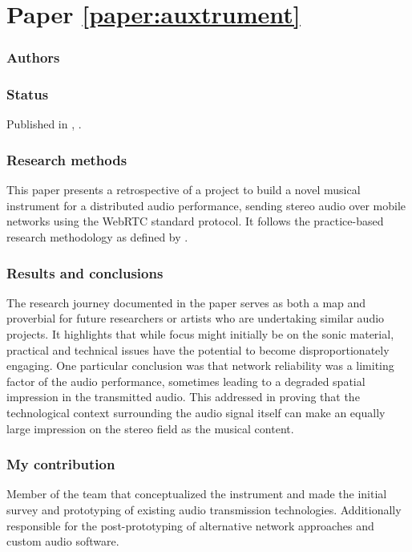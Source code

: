 \section*{Paper \ref{paper:auxtrument}}

\textbf{}

\subsubsection*{Authors}

\subsubsection*{Status}
Published in ,  \cite{franklinDevelopmentWebBasedRealTime2025}.

\subsubsection*{Research methods}
This paper presents a retrospective of a project to build a novel musical instrument for a  distributed audio performance, sending stereo audio over mobile networks using the WebRTC standard protocol. It follows the practice-based research methodology as defined by .

\subsubsection*{Results and conclusions}
The research journey documented in the paper serves as both a map and proverbial  for future researchers or artists who are undertaking similar audio projects. It highlights that while focus might initially be on the sonic material, practical and technical issues have the potential to become disproportionately engaging. One particular conclusion was that network reliability was a limiting factor of the audio performance, sometimes leading to a degraded spatial impression in the transmitted audio. This addressed \rqa{} in proving that the technological context surrounding the audio signal itself can make an equally large impression on the stereo field as the musical content.

\subsubsection*{My contribution}
Member of the team that conceptualized the instrument and made the initial survey and prototyping of existing audio transmission technologies. Additionally responsible for the post-prototyping of alternative network approaches and custom audio software.
